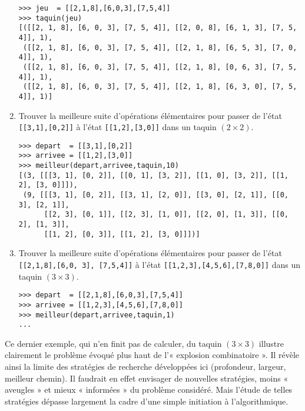 \begin{question}
\begin{enumerate}
\begin{minipage}{\textwidth}
\begin{Verbatim}
>>> jeu  = [[2,1,8],[6,0,3],[7,5,4]]
>>> taquin(jeu)
[([[2, 1, 8], [6, 0, 3], [7, 5, 4]], [[2, 0, 8], [6, 1, 3], [7, 5, 4]], 1), 
 ([[2, 1, 8], [6, 0, 3], [7, 5, 4]], [[2, 1, 8], [6, 5, 3], [7, 0, 4]], 1), 
 ([[2, 1, 8], [6, 0, 3], [7, 5, 4]], [[2, 1, 8], [0, 6, 3], [7, 5, 4]], 1), 
 ([[2, 1, 8], [6, 0, 3], [7, 5, 4]], [[2, 1, 8], [6, 3, 0], [7, 5, 4]], 1)]
\end{Verbatim}
\end{minipage}

\item Trouver la  meilleure suite d'opérations élémentaires
	pour passer de l'état \texttt{[[3,1],[0,2]]} à l'état 
	\texttt{[[1,2],[3,0]]} dans un taquin $(2\times 2)$.
	\vspace*{0.2mm}
	
\noindent\begin{minipage}{\textwidth}\em\footnotesize
\begin{Verbatim}
>>> depart  = [[3,1],[0,2]]
>>> arrivee = [[1,2],[3,0]]
>>> meilleur(depart,arrivee,taquin,10)
[(3, [[[3, 1], [0, 2]], [[0, 1], [3, 2]], [[1, 0], [3, 2]], [[1, 2], [3, 0]]]), 
 (9, [[[3, 1], [0, 2]], [[3, 1], [2, 0]], [[3, 0], [2, 1]], [[0, 3], [2, 1]], 
      [[2, 3], [0, 1]], [[2, 3], [1, 0]], [[2, 0], [1, 3]], [[0, 2], [1, 3]], 
      [[1, 2], [0, 3]], [[1, 2], [3, 0]]])]
\end{Verbatim}
\end{minipage}

\item Trouver la  meilleure suite d'opérations élémentaires
	pour passer de l'état \texttt{[[2,1,8],[6,0, 3], [7,5,4]]} à l'état 
	\texttt{[[1,2,3],[4,5,6],[7,8,0]]} dans un taquin $(3\times 3)$.
	\vspace*{0.2mm}

\noindent\begin{minipage}{\textwidth}\em\footnotesize
\begin{Verbatim}
>>> depart  = [[2,1,8],[6,0,3],[7,5,4]]
>>> arrivee = [[1,2,3],[4,5,6],[7,8,0]]
>>> meilleur(depart,arrivee,taquin,1)
...
\end{Verbatim}
\end{minipage}

\end{enumerate}

\end{question}

Ce dernier exemple, qui n'en finit pas de calculer, du taquin $(3\times 3)$ illustre clairement le problème évoqué plus haut
de l'« explosion combinatoire ». Il révèle ainsi la limite des stratégies de recherche
développées ici (profondeur, largeur, meilleur chemin). 
Il faudrait en effet envisager de nouvelles stratégies, moins « aveugles » et mieux « informées » du problème considéré. Mais l'étude de telles stratégies dépasse
largement la cadre d'une simple initiation à l'algorithmique.
